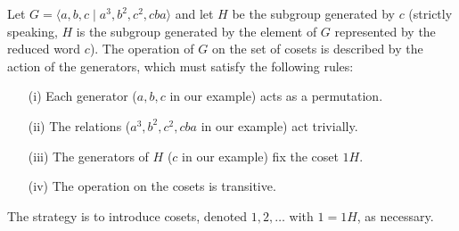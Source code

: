 \documentclass[a4paper,11pt,final,openany]{memoir}%
\theoremstyle{nonumberplain}
\begin{document}
Let $G=\langle a,b,c\mid a^{3},b^{2},c^{2},cba\rangle$ and let $H$ be the
subgroup generated by $c$ (strictly speaking, $H$ is the subgroup generated by
the element of $G$ represented by the reduced word $c$). The operation of $G$
on the set of cosets is described by the action of the generators, which must
satisfy the following rules:

\begin{enumerate}
\item[(i)] Each generator ($a,b,c$ in our example) acts as a permutation.

\item[(ii)] The relations ($a^{3},b^{2},c^{2},cba$ in our example) act trivially.

\item[(iii)] The generators of $H$ ($c$ in our example) fix the coset $1H$.

\item[(iv)] The operation on the cosets is transitive.
\end{enumerate}

The strategy is to introduce cosets, denoted $1,2,\ldots$ with $1 =1H$, as necessary.
\end{document}
